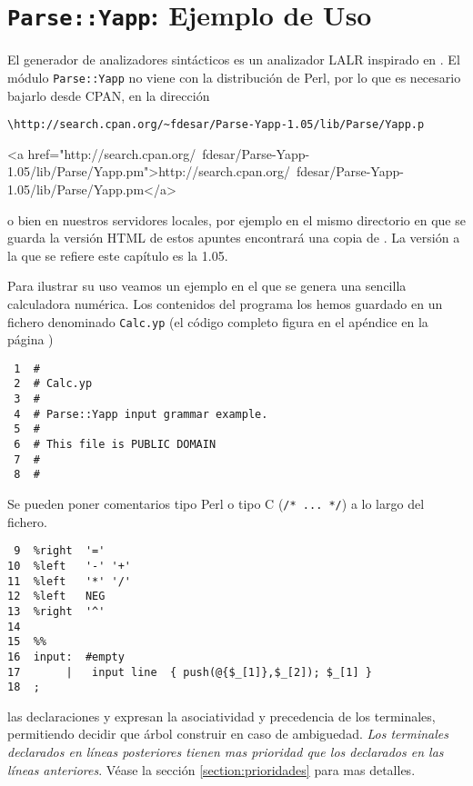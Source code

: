 \section{{\tt Parse::Yapp}: Ejemplo de Uso}
\label{section:ejemplodeuso}
El generador de analizadores sintácticos  es un
analizador LALR inspirado en . El módulo
\verb|Parse::Yapp| no viene con la distribución de Perl, por lo que es necesario
bajarlo desde CPAN, en la dirección 

\begin{latexonly}
\begin{verbatim}
\http://search.cpan.org/~fdesar/Parse-Yapp-1.05/lib/Parse/Yapp.p
\end{verbatim}
\end{latexonly}

\begin{rawhtml}
<a href="http://search.cpan.org/~fdesar/Parse-Yapp-1.05/lib/Parse/Yapp.pm">http://search.cpan.org/~fdesar/Parse-Yapp-1.05/lib/Parse/Yapp.pm</a> 
\end{rawhtml}

o bien en nuestros servidores locales,
por ejemplo en el mismo directorio en que se guarda
la versión HTML de estos apuntes encontrará una copia de 
.
La versión a la que se refiere este capítulo es la 1.05.


Para ilustrar su uso veamos
un ejemplo en el que se genera una sencilla calculadora numérica. 
Los contenidos del programa  los hemos guardado
en un fichero denominado \verb|Calc.yp|
(el código completo figura en el apéndice 
en la página \pageref{apendice:calcyp})

\begin{verbatim}
 1  #
 2  # Calc.yp
 3  # 
 4  # Parse::Yapp input grammar example.
 5  #
 6  # This file is PUBLIC DOMAIN 
 7  #
 8  #
\end{verbatim}
Se pueden poner comentarios tipo Perl o tipo C (\verb|/* ... */|)
a lo largo del fichero.
\begin{verbatim}
 9  %right  '='
10  %left   '-' '+'
11  %left   '*' '/'
12  %left   NEG
13  %right  '^'
14  
15  %%
16  input:  #empty
17       |   input line  { push(@{$_[1]},$_[2]); $_[1] }
18  ;
\end{verbatim}
las declaraciones  y  expresan la asociatividad
y precedencia de los terminales, permitiendo decidir que árbol construir 
en caso de  ambiguedad. 
\emph{ Los terminales declarados en líneas 
posteriores tienen mas prioridad que los declarados en las líneas anteriores}.
Véase la sección \ref{section:prioridades} para mas detalles.

